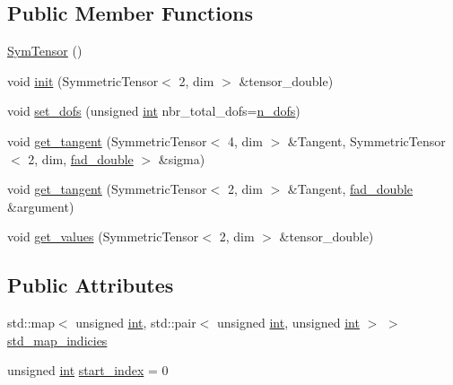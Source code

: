 \subsection*{Public Member Functions}
\begin{DoxyCompactItemize}
\item 
\hyperlink{classSacado__Wrapper_1_1SymTensor_a4e7ec32177eb891e3f1a32a16bcd59f5}{Sym\+Tensor} ()
\item 
void \hyperlink{classSacado__Wrapper_1_1SymTensor_acbad579d5ead9e96ff46aa15d9b5aef4}{init} (Symmetric\+Tensor$<$ 2, dim $>$ \&tensor\+\_\+double)
\item 
void \hyperlink{classSacado__Wrapper_1_1SymTensor_aa9e0fcc9d4e0a4120bedb8ef9b8d7ecb}{set\+\_\+dofs} (unsigned \hyperlink{CMakeCache_8txt_a79a3d8790b2588b09777910863574e09}{int} nbr\+\_\+total\+\_\+dofs=\hyperlink{classSacado__Wrapper_1_1SymTensor_a733bc4b029ff8d067b48e7ce3ee7606b}{n\+\_\+dofs})
\item 
void \hyperlink{classSacado__Wrapper_1_1SymTensor_ab97427c3b5cab279e58607cf431ab262}{get\+\_\+tangent} (Symmetric\+Tensor$<$ 4, dim $>$ \&Tangent, Symmetric\+Tensor$<$ 2, dim, \hyperlink{Sacado__example_8cc_a868b94676739e612d9c95940e70892a9}{fad\+\_\+double} $>$ \&sigma)
\item 
void \hyperlink{classSacado__Wrapper_1_1SymTensor_ac0ab9caa8c54102e24c4d007f820873b}{get\+\_\+tangent} (Symmetric\+Tensor$<$ 2, dim $>$ \&Tangent, \hyperlink{Sacado__example_8cc_a868b94676739e612d9c95940e70892a9}{fad\+\_\+double} \&argument)
\item 
void \hyperlink{classSacado__Wrapper_1_1SymTensor_afbab1ce0f846f026f5bd8b449180b5e9}{get\+\_\+values} (Symmetric\+Tensor$<$ 2, dim $>$ \&tensor\+\_\+double)
\end{DoxyCompactItemize}
\subsection*{Public Attributes}
\begin{DoxyCompactItemize}
\item 
std\+::map$<$ unsigned \hyperlink{CMakeCache_8txt_a79a3d8790b2588b09777910863574e09}{int}, std\+::pair$<$ unsigned \hyperlink{CMakeCache_8txt_a79a3d8790b2588b09777910863574e09}{int}, unsigned \hyperlink{CMakeCache_8txt_a79a3d8790b2588b09777910863574e09}{int} $>$ $>$ \hyperlink{classSacado__Wrapper_1_1SymTensor_ae3b1c56cde3fc5c7805b618ef3d9de75}{std\+\_\+map\+\_\+indicies}
\item 
unsigned \hyperlink{CMakeCache_8txt_a79a3d8790b2588b09777910863574e09}{int} \hyperlink{classSacado__Wrapper_1_1SymTensor_afe921e6044e4110fcfc848c52844d650}{start\+\_\+index} = 0
\end{DoxyCompactItemize}

